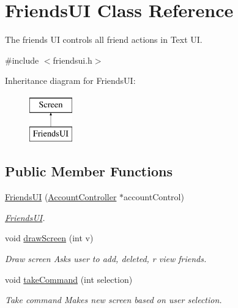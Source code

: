 \hypertarget{classFriendsUI}{}\section{Friends\+UI Class Reference}
\label{classFriendsUI}


The friends UI controls all friend actions in Text UI.  




{\ttfamily \#include $<$friendsui.\+h$>$}

Inheritance diagram for Friends\+UI\+:\begin{figure}[H]
\begin{center}
\leavevmode
\includegraphics[height=2.000000cm]{classFriendsUI}
\end{center}
\end{figure}
\subsection*{Public Member Functions}
\begin{DoxyCompactItemize}
\item 
\hyperlink{classFriendsUI_aabbf8a7a8bce0e59f49af0d5d198d86e}{Friends\+UI} (\hyperlink{classAccountController}{Account\+Controller} $\ast$account\+Control)
\begin{DoxyCompactList}\small\item\em \hyperlink{classFriendsUI}{Friends\+UI}. \end{DoxyCompactList}\item 
void \hyperlink{classFriendsUI_a155f56089ee79ce326198d0e88d464d0}{draw\+Screen} (int v)
\begin{DoxyCompactList}\small\item\em Draw screen Asks user to add, deleted, r view friends. \end{DoxyCompactList}\item 
void \hyperlink{classFriendsUI_a0f7c269fe7052ef2bdfa0766e19a3704}{take\+Command} (int selection)
\begin{DoxyCompactList}\small\item\em Take command Makes new screen based on user selection. \end{DoxyCompactList}\end{DoxyCompactItemize}
